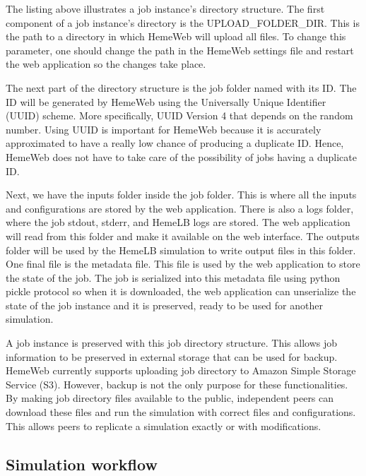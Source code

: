 The listing above illustrates a job instance's directory structure.  The first component of a job instance's directory is the UPLOAD\_FOLDER\_DIR. This is the path to a directory in which HemeWeb will upload all files. To change this parameter, one should change the path in the HemeWeb settings file and restart the web application so the changes take place.

The next part of the directory structure is the job folder named with its ID. The ID will be generated by HemeWeb using the Universally Unique Identifier (UUID) scheme. More specifically, UUID Version 4 that depends on the random number. Using UUID is important for HemeWeb because it is accurately approximated to have a really low chance of producing a duplicate ID. Hence, HemeWeb does not have to take care of the possibility of jobs having a duplicate ID.

Next, we have the inputs folder inside the job folder. This is where all the inputs and configurations are stored by the web application. There is also a logs folder, where the job stdout, stderr, and HemeLB logs are stored. The web application will read from this folder and make it available on the web interface. The outputs folder will be used by the HemeLB simulation to write output files in this folder. One final file is the metadata file. This file is used by the web application to store the state of the job. The job is serialized into this metadata file using python pickle protocol so when it is downloaded, the web application can unserialize the state of the job instance and it is preserved, ready to be used for another simulation.

A job instance is preserved with this job directory structure. This allows job information to be preserved in external storage that can be used for backup. HemeWeb currently supports uploading job directory to Amazon Simple Storage Service (S3). However, backup is not the only purpose for these functionalities. By making job directory files available to the public, independent peers can download these files and run the simulation with correct files and configurations. This allows peers to replicate a simulation exactly or with modifications.

\subsection{Simulation workflow}

\vspace{1cm}

